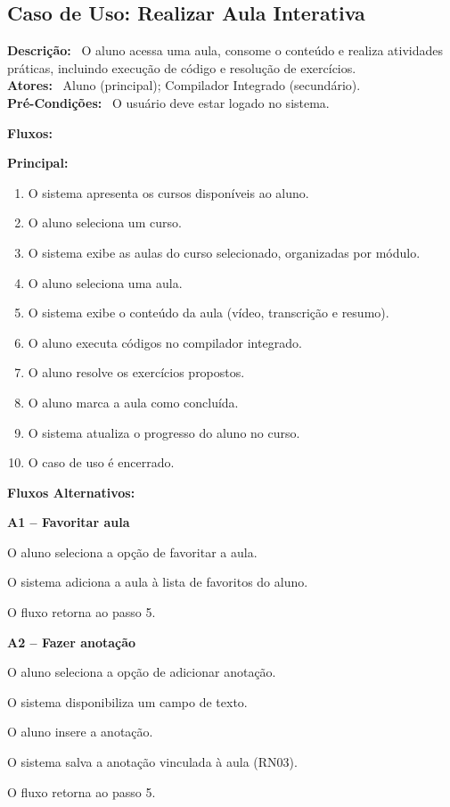 \documentclass[11pt,a4paper]{article}
\newcommand{\casodeuso}[1]{\subsection{Caso de Uso: #1}}
\newcommand{\campo}[1]{\textbf{#1:}~}
\newcommand{\fluxotitulo}[1]{\par\needspace{8\baselineskip}\medskip\hspace*{1.5em}\textbf{#1}\par\nopagebreak}
\newcommand{\subfluxo}[1]{\par\needspace{4\baselineskip}\smallskip\hspace*{1.5em}\textbf{#1}\par\nopagebreak}
\newenvironment{principal}
  {\begin{enumerate}[leftmargin=4.5em,itemsep=0pt,topsep=2pt]}
  {\end{enumerate}}
\newenvironment{passos}
  {\begin{description}[leftmargin=4.5em,labelindent=3em,itemsep=0pt,topsep=2pt,
     font=\normalfont\bfseries,style=sameline]}
  {\end{description}}
\newcommand{\passo}[1]{\item[#1 -]}
\begin{document}
  \casodeuso{Realizar Aula Interativa}

  \campo{Descrição} O aluno acessa uma aula, consome o conteúdo e realiza
  atividades práticas, incluindo execução de código e resolução de exercícios.\\
  \campo{Atores} Aluno (principal); Compilador Integrado (secundário).\\
  \campo{Pré-Condições} O usuário deve estar logado no sistema.

  \campo{Fluxos}

  \fluxotitulo{Principal:}
  \begin{principal}
    \item O sistema apresenta os cursos disponíveis ao aluno.
    \item O aluno seleciona um curso.
    \item O sistema exibe as aulas do curso selecionado, organizadas por módulo.
    \item O aluno seleciona uma aula.
    \item O sistema exibe o conteúdo da aula (vídeo, transcrição e resumo).
    \item O aluno executa códigos no compilador integrado.
    \item O aluno resolve os exercícios propostos.
    \item O aluno marca a aula como concluída.
    \item O sistema atualiza o progresso do aluno no curso.
    \item O caso de uso é encerrado.
  \end{principal}

  \fluxotitulo{Fluxos Alternativos:}

  \subfluxo{A1 -- Favoritar aula}
  \begin{passos}
    \passo{A1.1} O aluno seleciona a opção de favoritar a aula.
    \passo{A1.2} O sistema adiciona a aula à lista de favoritos do aluno.
    \passo{A1.3} O fluxo retorna ao passo 5.
  \end{passos}

  \subfluxo{A2 -- Fazer anotação}
  \begin{passos}
    \passo{A2.1} O aluno seleciona a opção de adicionar anotação.
    \passo{A2.2} O sistema disponibiliza um campo de texto.
    \passo{A2.3} O aluno insere a anotação.
    \passo{A2.4} O sistema salva a anotação vinculada à aula (RN03).
    \passo{A2.5} O fluxo retorna ao passo 5.
  \end{passos}
\end{document}

